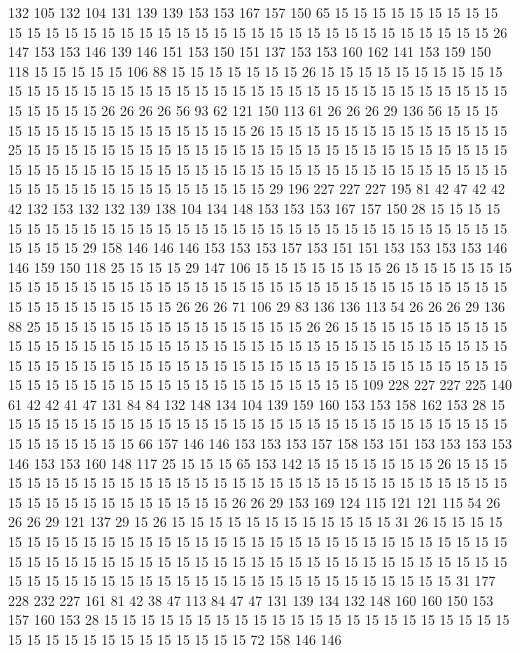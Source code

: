 132 105 132 104 131 139 139 153 153 167 157 150 65 15 15 15 15 15 15 15
15 15 15 15 15 15 15 15 15 15 15 15 15 15 15 15 15 15 15 15
15 15 15 15 15 15 15 15 26 147 153 153 146 139 146 151 153 150 151 137
153 153 160 162 141 153 159 150 118 15 15 15 15 15 106 88 15 15 15 15
15 15 15 26 15 15 15 15 15 15 15 15 15 15 15 15 15 15 15 15
15 15 15 15 15 15 15 15 15 15 15 15 15 15 15 15 15 15 15 15
15 15 15 15 15 15 26 26 26 26 56 93 62 121 150 113 61 26 26 26
29 136 56 15 15 15 15 15 15 15 15 15 15 15 15 15 15 15 15 26
15 15 15 15 15 15 15 15 15 15 15 15 15 25 15 15 15 15 15 15
15 15 15 15 15 15 15 15 15 15 15 15 15 15 15 15 15 15 15 15
15 15 15 15 15 15 15 15 15 15 15 15 15 15 15 15 15 15 15 15
15 15 15 15 15 15 15 15 15 15 15 15 15 15 15 15 15 15 15 15
15 29 196 227 227 227 195 81 42 47 42 42 42 132 153 132 132 139 138 104
134 148 153 153 153 167 157 150 28 15 15 15 15 15 15 15 15 15 15 15
15 15 15 15 15 15 15 15 15 15 15 15 15 15 15 15 15 15 15 15
15 15 15 15 29 158 146 146 146 153 153 153 157 153 151 151 153 153 153 153
146 146 159 150 118 25 15 15 15 29 147 106 15 15 15 15 15 15 15 26
15 15 15 15 15 15 15 15 15 15 15 15 15 15 15 15 15 15 15 15
15 15 15 15 15 15 15 15 15 15 15 15 15 15 15 15 15 15 15 15
15 15 26 26 26 71 106 29 83 136 136 113 54 26 26 26 29 136 88 25
15 15 15 15 15 15 15 15 15 15 15 15 15 15 26 26 15 15 15 15
15 15 15 15 15 15 15 15 15 15 15 15 15 15 15 15 15 15 15 15
15 15 15 15 15 15 15 15 15 15 15 15 15 15 15 15 15 15 15 15
15 15 15 15 15 15 15 15 15 15 15 15 15 15 15 15 15 15 15 15
15 15 15 15 15 15 15 15 15 15 15 15 15 15 15 15 15 15 109 228
227 227 225 140 61 42 42 41 47 131 84 84 132 148 134 104 139 159 160 153
153 158 162 153 28 15 15 15 15 15 15 15 15 15 15 15 15 15 15 15
15 15 15 15 15 15 15 15 15 15 15 15 15 15 15 15 15 15 15 15
66 157 146 146 153 153 153 157 158 153 151 153 153 153 153 146 153 153 160 148
117 25 15 15 15 65 153 142 15 15 15 15 15 15 15 26 15 15 15 15
15 15 15 15 15 15 15 15 15 15 15 15 15 15 15 15 15 15 15 15
15 15 15 15 15 15 15 15 15 15 15 15 15 15 15 15 15 15 26 26
29 153 169 124 115 121 121 115 54 26 26 26 29 121 137 29 15 26 15 15
15 15 15 15 15 15 15 15 15 15 31 26 15 15 15 15 15 15 15 15
15 15 15 15 15 15 15 15 15 15 15 15 15 15 15 15 15 15 15 15
15 15 15 15 15 15 15 15 15 15 15 15 15 15 15 15 15 15 15 15
15 15 15 15 15 15 15 15 15 15 15 15 15 15 15 15 15 15 15 15
15 15 15 15 15 15 15 15 15 15 15 15 15 15 31 177 228 232 227 161
81 42 38 47 113 84 47 47 131 139 134 132 148 160 160 150 153 157 160 153
28 15 15 15 15 15 15 15 15 15 15 15 15 15 15 15 15 15 15 15
15 15 15 15 15 15 15 15 15 15 15 15 15 15 15 15 72 158 146 146
